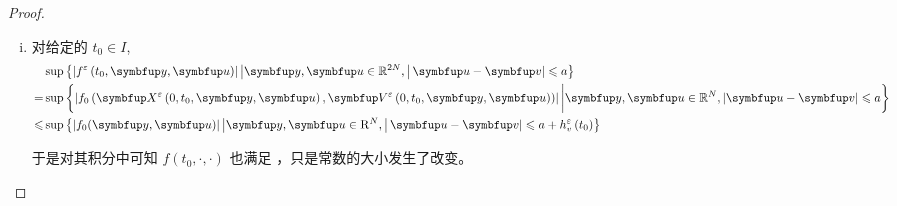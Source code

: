 
\begin{proof}
    \begin{enumerate}[(i)]
        \item 对给定的 $t_0\in I$,
        $$\begin{aligned}
            &\sup \left\{\left|f^{\varepsilon}\left(t_{0}, \vy, \vect{u}\right)\right|\left|\vy, \vect{u} \in \mathbb{R}^{2 N},\right| \vect{u}-\vv | \leqslant a\right\}\\
        =&\sup \left\{\left|f_0\left(  \vect{X}^{\varepsilon}\left(0, t_{0}, \vy, \vect{u}\right), \vect{V}^{\varepsilon}\left(0, t_{0}, \vy, \vect{u}\right) \right) \right|  \bigg| \vy,\vect{u} \in \mathbb{R}^{ N},\left|\vect{u}-\vv\right| \leqslant a\right\}\\
        \leqslant &\sup \left\{|f_0(\vy, \vect{u})|\left|\vy,\vect{u} \in \mathrm{R}^{N},\right| \vect{u}-\vv | \leqslant a+h_{v}^{\varepsilon}\left(t_{0}\right)\right\}
        \end{aligned}$$
        
        于是对其积分中可知 $f(t_0, \cdot, \cdot)$ 也满足 \supremumf，只是常数的大小发生了改变。
    \end{enumerate}
\end{proof}

